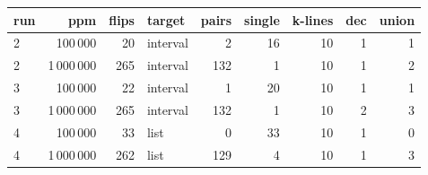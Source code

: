 \begin{tabular}{@{}lrrlrrrrr@{}}
\toprule
run & ppm & flips & target & pairs & single & k-lines & dec & union \\
\midrule
2 & 100\,000 & 20 & interval & 2 & 16 & 10 & 1 & 1 \\
2 & 1\,000\,000 & 265 & interval & 132 & 1 & 10 & 1 & 2 \\
3 & 100\,000 & 22 & interval & 1 & 20 & 10 & 1 & 1 \\
3 & 1\,000\,000 & 265 & interval & 132 & 1 & 10 & 2 & 3 \\
4 & 100\,000 & 33 & list & 0 & 33 & 10 & 1 & 0 \\
4 & 1\,000\,000 & 262 & list & 129 & 4 & 10 & 1 & 3 \\
\bottomrule
\end{tabular}

